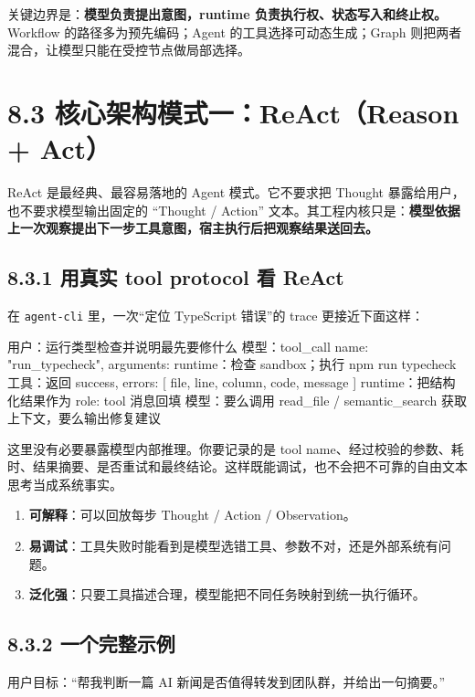 关键边界是：\textbf{模型负责提出意图，runtime 负责执行权、状态写入和终止权。} Workflow 的路径多为预先编码；Agent 的工具选择可动态生成；Graph 则把两者混合，让模型只能在受控节点做局部选择。


\section{8.3 核心架构模式一：ReAct（Reason + Act）}

ReAct 是最经典、最容易落地的 Agent 模式。它不要求把 Thought 暴露给用户，也不要求模型输出固定的 ``Thought / Action'' 文本。其工程内核只是：\textbf{模型依据上一次观察提出下一步工具意图，宿主执行后把观察结果送回去。}


\subsection{8.3.1 用真实 tool protocol 看 ReAct}

在 \texttt{agent-cli} 里，一次``定位 TypeScript 错误''的 trace 更接近下面这样：


\begin{codeblock}
用户：运行类型检查并说明最先要修什么
模型：tool_call { name: "run_typecheck", arguments: {} }
runtime：检查 sandbox；执行 npm run typecheck
工具：返回 { success, errors: [{ file, line, column, code, message }] }
runtime：把结构化结果作为 role: tool 消息回填
模型：要么调用 read_file / semantic_search 获取上下文，要么输出修复建议
\end{codeblock}

这里没有必要暴露模型内部推理。你要记录的是 tool name、经过校验的参数、耗时、结果摘要、是否重试和最终结论。这样既能调试，也不会把不可靠的自由文本思考当成系统事实。


\begin{enumerate}[leftmargin=2em]
\item \textbf{可解释}：可以回放每步 Thought / Action / Observation。
\item \textbf{易调试}：工具失败时能看到是模型选错工具、参数不对，还是外部系统有问题。
\item \textbf{泛化强}：只要工具描述合理，模型能把不同任务映射到统一执行循环。
\end{enumerate}

\subsection{8.3.2 一个完整示例}

用户目标：``帮我判断一篇 AI 新闻是否值得转发到团队群，并给出一句摘要。''


